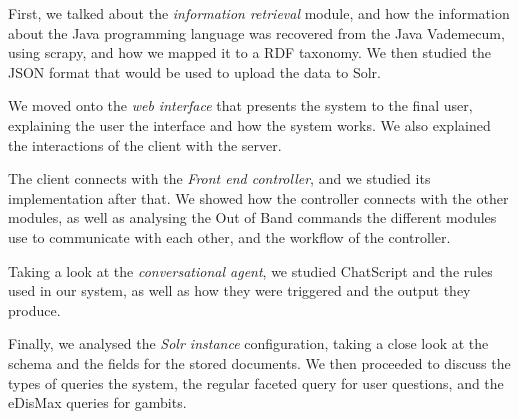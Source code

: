 First, we talked about the \emph{information retrieval} module, and how the information about the Java programming language was recovered from the Java Vademecum, using scrapy, and how we mapped it to a RDF taxonomy. We then studied the JSON format that would be used to upload the data to Solr.

We moved onto the \emph{web interface} that presents the system to the final user, explaining the user the interface and how the system works. We also explained the interactions of the client with the server. 

The client connects with the \emph{Front end controller}, and we studied its implementation after that. We showed how the controller connects with the other modules, as well as analysing the Out of Band commands the different modules use to communicate with each other, and the workflow of the controller.

Taking a look at the \emph{conversational agent}, we studied ChatScript and the rules used in our system, as well as how they were triggered and the output they produce.

Finally, we analysed the \emph{Solr instance} configuration, taking a close look at the schema and the fields for the stored documents. We then proceeded to discuss the types of queries the system, the regular faceted query for user questions, and the eDisMax queries for gambits.